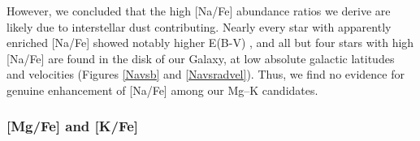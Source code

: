 \documentclass[a4paper,fleqn,usenatbib]{mnras}
\begin{document}
However, we concluded that the high [Na/Fe] abundance ratios we derive are likely due to interstellar dust contributing. Nearly every star with apparently enriched [Na/Fe] showed notably higher E(B-V) \citep{schlafly2011}, and all but four stars with high [Na/Fe] are found in the disk of our Galaxy, at low absolute galactic latitudes and velocities (Figures \ref{Navsb} and \ref{Navsradvel}). Thus, we find no evidence for genuine  enhancement of [Na/Fe] among our Mg--K candidates.


\subsubsection{[Mg/Fe] and [K/Fe]}
\end{document}
